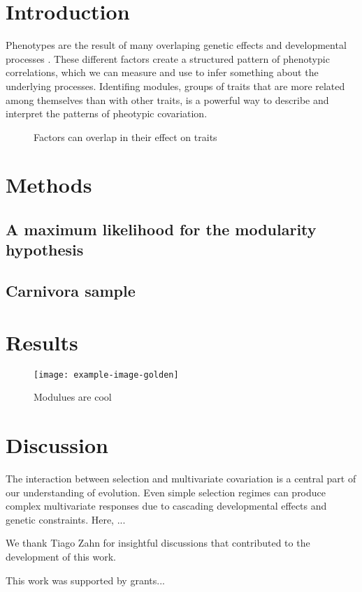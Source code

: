 \section*{Introduction}

Phenotypes are the result of many overlaping genetic effects and developmental processes \citep{Lande1983-ez,Klingenberg2008-ll,Melo2016-yw}. These different 
factors create a structured pattern of phenotypic correlations, which we can measure and use to infer
something about the underlying processes. Identifing modules, groups of traits that are more related
among themselves than with other traits, is a powerful way to describe and interpret the patterns of 
pheotypic covariation.

\begin{figure}[h]
    \center
    
\caption[Factors and modules]{ Factors can overlap in their effect on traits }
\label{fig:factor-diagram}
\end{figure} 

\section*{Methods}

\subsection*{A maximum likelihood for the modularity hypothesis}

\subsection*{Carnivora sample}


\section*{Results}


\begin{figure}[h]
\texttt{[image: example-image-golden]}
\caption[Factors and modules]{ Modulues are cool }
\label{fig:example-fig}
\end{figure}



\section*{Discussion}

The interaction between selection and multivariate covariation is a
central part of our understanding of evolution. Even simple selection
regimes can produce complex multivariate responses due to cascading
developmental effects and genetic constraints. Here, ...


\begin{notes}[Acknowledgments]
We thank Tiago Zahn for insightful discussions that contributed to the
development of this work.
\end{notes}

\begin{notes}[Funding]
This work was supported by grants...
\end{notes}
